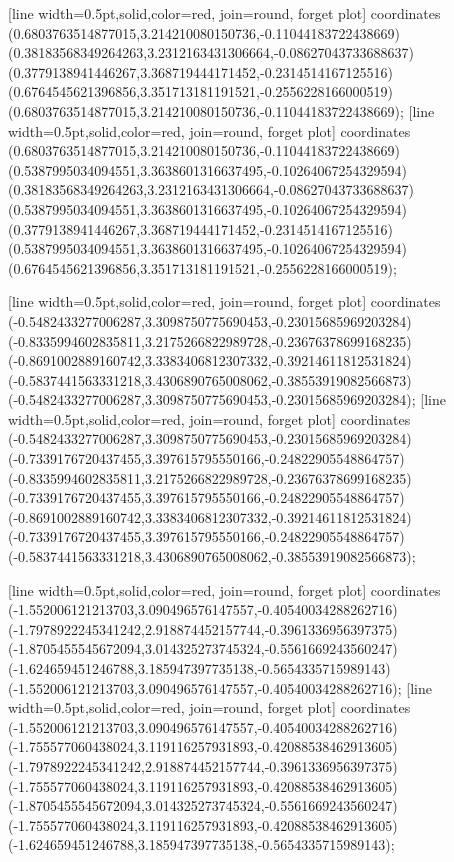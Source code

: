 [line width=0.5pt,solid,color=red, join=round, forget plot] coordinates {(0.6803763514877015,3.214210080150736,-0.11044183722438669) (0.38183568349264263,3.2312163431306664,-0.08627043733688637) (0.3779138941446267,3.368719444171452,-0.2314514167125516) (0.6764545621396856,3.351713181191521,-0.2556228166000519) (0.6803763514877015,3.214210080150736,-0.11044183722438669)};
[line width=0.5pt,solid,color=red, join=round, forget plot] coordinates {(0.6803763514877015,3.214210080150736,-0.11044183722438669) (0.5387995034094551,3.3638601316637495,-0.10264067254329594) (0.38183568349264263,3.2312163431306664,-0.08627043733688637) (0.5387995034094551,3.3638601316637495,-0.10264067254329594) (0.3779138941446267,3.368719444171452,-0.2314514167125516) (0.5387995034094551,3.3638601316637495,-0.10264067254329594) (0.6764545621396856,3.351713181191521,-0.2556228166000519)};

[line width=0.5pt,solid,color=red, join=round, forget plot] coordinates {(-0.5482433277006287,3.3098750775690453,-0.23015685969203284) (-0.8335994602835811,3.2175266822989728,-0.23676378699168235) (-0.8691002889160742,3.3383406812307332,-0.39214611812531824) (-0.5837441563331218,3.4306890765008062,-0.38553919082566873) (-0.5482433277006287,3.3098750775690453,-0.23015685969203284)};
[line width=0.5pt,solid,color=red, join=round, forget plot] coordinates {(-0.5482433277006287,3.3098750775690453,-0.23015685969203284) (-0.7339176720437455,3.397615795550166,-0.24822905548864757) (-0.8335994602835811,3.2175266822989728,-0.23676378699168235) (-0.7339176720437455,3.397615795550166,-0.24822905548864757) (-0.8691002889160742,3.3383406812307332,-0.39214611812531824) (-0.7339176720437455,3.397615795550166,-0.24822905548864757) (-0.5837441563331218,3.4306890765008062,-0.38553919082566873)};

[line width=0.5pt,solid,color=red, join=round, forget plot] coordinates {(-1.552006121213703,3.090496576147557,-0.40540034288262716) (-1.7978922245341242,2.918874452157744,-0.3961336956397375) (-1.8705455545672094,3.014325273745324,-0.5561669243560247) (-1.624659451246788,3.185947397735138,-0.5654335715989143) (-1.552006121213703,3.090496576147557,-0.40540034288262716)};
[line width=0.5pt,solid,color=red, join=round, forget plot] coordinates {(-1.552006121213703,3.090496576147557,-0.40540034288262716) (-1.755577060438024,3.119116257931893,-0.42088538462913605) (-1.7978922245341242,2.918874452157744,-0.3961336956397375) (-1.755577060438024,3.119116257931893,-0.42088538462913605) (-1.8705455545672094,3.014325273745324,-0.5561669243560247) (-1.755577060438024,3.119116257931893,-0.42088538462913605) (-1.624659451246788,3.185947397735138,-0.5654335715989143)};

